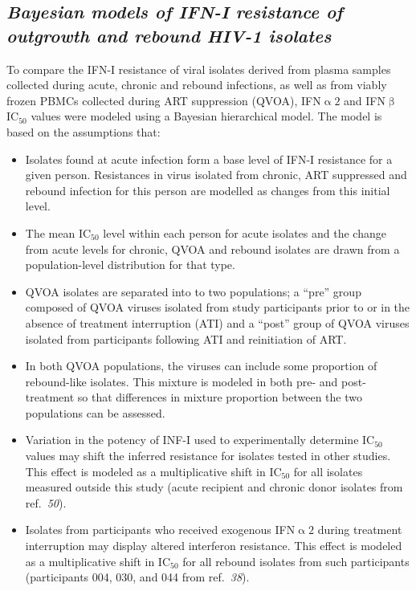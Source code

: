 \documentclass[12pt]{article}
\newcommand{\ifna}{IFN\hspace{-.08em}${\upalpha 2}$}
\newcommand{\ifnb}{IFN\hspace{-.03em}${\upbeta}$}
\newcommand{\icFifty}{IC$_{50}$}
\newcommand{\iyerRef}{\textit{50}}
\newcommand{\azzRef}{\textit{38}}
\begin{document}
\subsection*{\it Bayesian models of IFN-I resistance of outgrowth and rebound HIV-1 isolates}
  To compare the IFN-I resistance of viral isolates derived from plasma samples collected during acute, chronic and rebound infections, as well as from viably frozen PBMCs collected during ART suppression (QVOA), \ifna{} and \ifnb{} \icFifty{} values were modeled using a Bayesian hierarchical model. The model is based on the assumptions that:
  \begin{itemize}
    \item Isolates found at acute infection form a base level of IFN-I resistance for a given person.  Resistances in virus isolated from chronic, ART suppressed and rebound infection for this person are modelled as changes from this initial level.
    \item The mean \icFifty{} level within each person for acute isolates and the change from acute levels for chronic, QVOA and rebound isolates are drawn from a population-level distribution for that type. 
    \item QVOA isolates are separated into to two populations; a ``pre'' group composed of QVOA viruses isolated from study participants prior to or in the absence of treatment interruption (ATI) and a ``post'' group of QVOA viruses isolated from participants following ATI and reinitiation of ART.
    \item In both QVOA populations, the viruses can include some proportion of rebound-like isolates. This mixture is modeled in both pre- and post-treatment so that differences in mixture proportion between the two populations can be assessed.
    \item Variation in the potency of INF-I used to experimentally determine \icFifty{} values may shift the inferred resistance for isolates tested in other studies. This effect is modeled as a multiplicative shift in \icFifty{} for all isolates measured outside this study (acute recipient and chronic donor isolates from ref.\ \iyerRef{}).
    \item Isolates from participants who received exogenous \ifna{} during treatment interruption may display altered interferon resistance. This effect is modeled as a multiplicative shift in \icFifty{} for all rebound isolates from such participants (participants 004, 030, and 044 from ref.\ \azzRef{}).
  \end{itemize}
\end{document}

